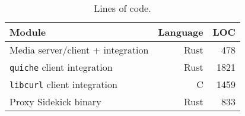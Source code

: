 \begin{table}[ht]
  \centering
  \begin{tabular}{l r r}
    \hline
    \textbf{Module} & \textbf{Language} & \textbf{LOC} \\
    \hline
    Media server/client + integration & Rust & 478 \\
    \texttt{quiche} client integration & Rust & 1821 \\
    \texttt{libcurl} client integration & C & 1459 \\
    Proxy Sidekick binary & Rust & 833 \\
    \hline
  \end{tabular}
  \caption{Lines of code.
  }
  \label{tab:lines-of-code}
\end{table}
